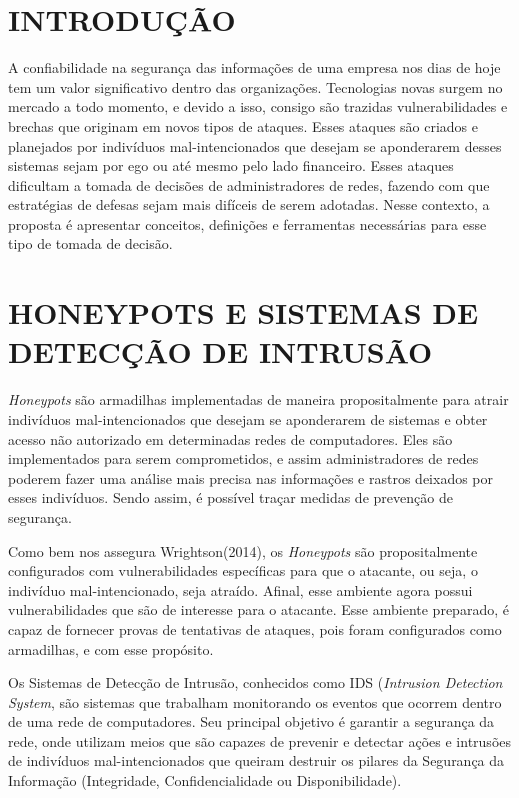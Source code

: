 \documentclass[article,12pt,oneside,a4paper,english,brazil]{unifil}
\begin{document}
\textual
\fontsize{12}{7}\selectfont
\begin{Spacing}{1.5}

\section*{INTRODUÇÃO}

A confiabilidade na segurança das informações de uma empresa nos dias de
hoje tem um valor significativo dentro das organizações.  Tecnologias novas surgem no mercado a todo momento, e devido a isso, consigo são trazidas vulnerabilidades e brechas que originam em novos tipos de ataques. Esses ataques são criados e planejados por indivíduos mal-intencionados que desejam  se aponderarem desses sistemas sejam por ego ou até mesmo pelo lado financeiro. Esses ataques dificultam a tomada de decisões de administradores de redes, fazendo com que estratégias de defesas sejam mais difíceis de serem adotadas. Nesse contexto, a proposta é apresentar conceitos, definições e ferramentas necessárias para esse tipo de tomada de decisão.

\section*{HONEYPOTS E SISTEMAS DE DETECÇÃO DE INTRUSÃO}

\textit{Honeypots} são armadilhas implementadas de maneira propositalmente para atrair indivíduos mal-intencionados que desejam se aponderarem de sistemas e obter acesso não autorizado em determinadas redes de computadores. Eles são implementados para serem comprometidos, e assim administradores de redes poderem fazer uma análise mais precisa nas informações e rastros deixados por esses indivíduos. Sendo assim, é possível traçar medidas de prevenção de segurança.

Como bem nos assegura Wrightson(2014), os \textit{Honeypots} são propositalmente configurados com vulnerabilidades específicas para que o atacante, ou seja, o indivíduo mal-intencionado, seja atraído. Afinal, esse ambiente agora possui vulnerabilidades que são de interesse para o atacante. Esse ambiente preparado, é capaz de fornecer provas de tentativas de ataques, pois foram configurados como armadilhas, e com esse propósito.

Os Sistemas de Detecção de Intrusão, conhecidos como IDS (\textit{Intrusion Detection System}, são sistemas que trabalham monitorando os eventos que ocorrem dentro de uma rede de computadores. Seu principal objetivo é garantir a segurança da rede, onde utilizam meios que são capazes de prevenir e detectar ações e intrusões de indivíduos mal-intencionados que queiram destruir os pilares da Segurança da Informação (Integridade, Confidencialidade ou Disponibilidade).


\end{Spacing}
\end{document}
